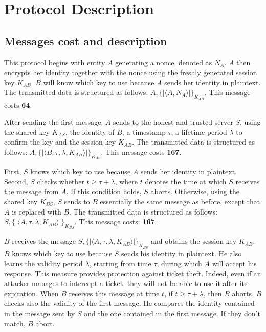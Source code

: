 \section{Protocol Description}

\subsection{Messages cost and description}



This protocol begins with entity $A$ generating a nonce, denoted as $N_A$. $A$ then encrypts her identity together
with the nonce using the freshly generated session key $K_{AB}$. $B$ will know which key to use because $A$ sends her identity in plaintext.
The transmitted data is structured as follows: $A, \{| \langle A,N_A \rangle |\}_{K_{AB}}$. This message costs \textbf{64}.

\vspace{1cm}

After sending the first message, $A$ sends to the honest and trusted server $S$, using the shared key $K_{AS}$,
the identity of $B$, a timestamp $\tau$, a lifetime period $\lambda$ to confirm the key and the session key $K_{AB}$. The
transmitted data is structured as follows: $A, \{| \langle B, \tau, \lambda, K_{AB} \rangle |\}_{K_{AS}}$.
This message costs \textbf{167}.

\vspace{1cm}

First, $S$ knows which key to use because $A$ sends her identity in plaintext. Second,  $S$ checks whether $t \geq \tau + \lambda$,
where $t$ denotes the time at which $S$ receives the message from
$A$. If this condition holds, $S$ aborts. Otherwise, using the shared key $K_{BS}$, $S$ sends to $B$ essentially the
same message as before, except that $A$ is replaced with $B$. The transmitted data is structured as follows:
$S, \{| \langle A, \tau, \lambda, K_{AB} \rangle |\}_{K_{BS}}$. This message costs: \textbf{167}.

\vspace{1cm}

$B$ receives the message $S, \{| \langle A, \tau, \lambda, K_{AB} \rangle |\}_{K_{BS}}$ and obtains the session key $K_{AB}$.
$B$ knows which key to use because $S$ sends his identity in plaintext.
He also learns the validity period $\lambda$, starting from time $\tau$, during which $A$ will accept his response.
This measure provides protection against ticket theft. Indeed, even if an attacker manages to intercept a ticket,
they will not be able to use it after its expiration. When $B$ receives this message at time $t$, if
$t \geq \tau + \lambda$, then $B$ aborts. $B$ checks also the validity of the first message. He compares the identity contained in
the message sent by $S$ and the one contained in the first message. If they don't match, $B$ abort.

